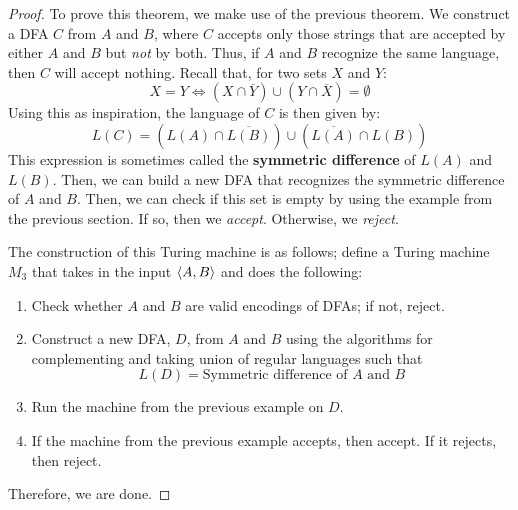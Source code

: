\documentclass[letterpaper]{article}
\begin{document}
\begin{mdframed}[]
    \begin{proof}
        To prove this theorem, we make use of the previous theorem. We construct a DFA $C$ from $A$ and $B$, where $C$ accepts only those strings that are accepted by either $A$ and $B$ but \emph{not} by both. Thus, if $A$ and $B$ recognize the same language, then $C$ will accept nothing. Recall that, for two sets $X$ and $Y$: 
        \[X = Y \iff \left(X \cap \overline{Y}\right) \cup \left(Y \cap \overline{X}\right) = \emptyset\]
        Using this as inspiration, the language of $C$ is then given by: 
        \[L(C) = \left(L(A) \cap \overline{L(B)}\right) \cup \left(\overline{L(A)} \cap L(B)\right)\]
        This expression is sometimes called the \textbf{symmetric difference} of $L(A)$ and $L(B)$. Then, we can build a new DFA that recognizes the symmetric difference of $A$ and $B$. Then, we can check if this set is empty by using the example from the previous section. If so, then we \emph{accept}. Otherwise, we \emph{reject}.

        \bigskip 

        The construction of this Turing machine is as follows; define a Turing machine $M_3$ that takes in the input $\langle A, B \rangle$ and does the following: 
        \begin{enumerate}
            \item Check whether $A$ and $B$ are valid encodings of DFAs; if not, reject.
            \item Construct a new DFA, $D$, from $A$ and $B$ using the algorithms for complementing and taking union of regular languages such that 
            \[L(D) = \text{Symmetric difference of } A \text{ and } B\]
            \item Run the machine from the previous example on $D$. 
            \item If the machine from the previous example accepts, then accept. If it rejects, then reject. 
        \end{enumerate}
        Therefore, we are done. 
    \end{proof}
\end{mdframed}
\end{document}
